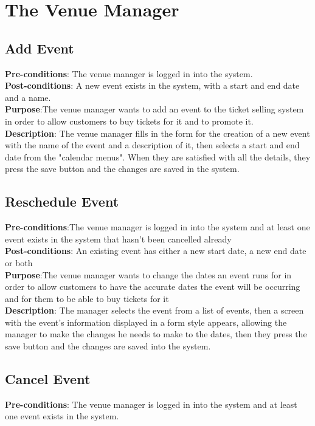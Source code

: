\section{The Venue Manager}

\subsection{Add Event}
\textbf{Pre-conditions}: The venue manager is logged in into the system.\\

\textbf{Post-conditions}: A new event exists in the system, with a start
and end date and a name.\\

\textbf{Purpose}:The venue manager wants to add an event to the ticket
selling system in order to allow customers to buy tickets for it and
to promote it.\\

\textbf{Description}: The venue manager fills in the form for the creation
of a new event with the name of the event and a description of it, then
selects a start and end date from the "calendar menus". When they are
satisfied with all the details, they press the save button and the
changes are saved in the system.

\subsection{Reschedule Event}
\textbf{Pre-conditions}:The venue manager is logged in into the system
and at least one event exists in the system that hasn't been cancelled
already\\

\textbf{Post-conditions}: An existing event has either a new start date,
a new end date or both\\

\textbf{Purpose}:The venue manager wants to change the dates an event
runs for in order to allow customers to have the accurate dates the
event will be occurring and for them to be able to buy tickets for it\\

\textbf{Description}:
The manager selects the event from a list of events, then a screen with
the event's information displayed in a form style appears, allowing the
manager to  make the changes he needs to make to the dates, then they
press the save button and the changes are saved into the system.

\subsection{Cancel Event}
\textbf{Pre-conditions}: The venue manager is logged in into the system and
at least one event exists in the system.\\

